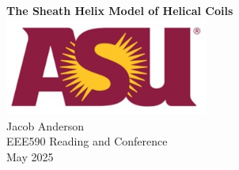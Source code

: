 \documentclass[12pt]{article} %
\begin{document}
	
	\begin{titlepage}
		\centering
		\vspace*{1.5cm} %
		{\LARGE\textbf{The Sheath Helix Model of Helical Coils}}\\[4cm]
		\includegraphics[width=0.5\textwidth]{asu.jpg} \\[3cm]
		{\Large Jacob Anderson} \\[3.5cm]
		{\large EEE590 Reading and Conference} \\[1cm]
		{\large May 2025}
	\end{titlepage}

\tableofcontents
\newpage




%

\newpage
	
\end{document}
